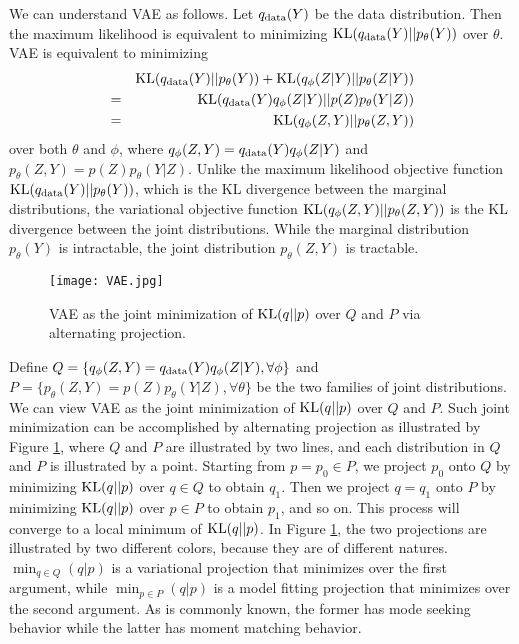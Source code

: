 \documentclass{article}
\def\KL{{\rm KL}}
\begin{document}
We can understand VAE as follows. Let $q_{\rm data}(Y)$ be the data distribution. Then the maximum likelihood is equivalent to minimizing ${\rm KL}(q_{\rm data}(Y)||p_\theta(Y))$ over $\theta$. VAE is equivalent to minimizing 
\begin{eqnarray}
\label{eqn5}
&&{\rm KL}(q_{\rm data}(Y)||p_\theta(Y)) + {\rm KL}(q_\phi(Z|Y)||p_\theta(Z|Y)) \nonumber \\
&=& {\rm KL}(q_{\rm data}(Y) q_\phi(Z|Y)||p(Z) p_\theta(Y|Z)) \\
&=&  {\rm KL}(q_\phi(Z, Y)||p_\theta(Z, Y)) 
\end{eqnarray}
over both $\theta$ and $\phi$, where $q_\phi(Z, Y) = q_{\rm data}(Y) q_\phi(Z|Y)$ and $p_\theta(Z, Y) =  p(Z) p_\theta(Y|Z)$.  Unlike the maximum likelihood objective function ${\rm KL}(q_{\rm data}(Y)||p_\theta(Y))$, which is the KL divergence between the marginal distributions, the variational objective function   ${\rm KL}(q_\phi(Z, Y)||p_\theta(Z, Y))$  is the KL divergence between the joint distributions. While the marginal distribution $p_\theta(Y)$ is intractable, the joint distribution $p_\theta(Z, Y)$ is tractable. 
\begin{figure}[h]
\begin{center}
\texttt{[image: VAE.jpg]}
\caption{VAE as the joint minimization of $\KL(q||p)$ over $Q$ and $P$ via alternating projection. }
\label{fig:VAE}
\end{center}
\end{figure}

Define $Q = \{ q_\phi(Z, Y) = q_{\rm data}(Y) q_\phi(Z|Y), \forall \phi\}$ and $P = \{ p_\theta(Z, Y) =  p(Z) p_\theta(Y|Z), \forall \theta\}$ be the two families of joint distributions. We can view VAE as the joint minimization of ${\rm KL}(q||p)$ over $Q$ and $P$. Such joint minimization can be accomplished by alternating projection as illustrated by Figure \ref{fig:VAE}, where $Q$ and $P$ are illustrated by two lines, and each distribution in $Q$ and $P$ is illustrated by a point. Starting from $p = p_0 \in P$, we project $p_0$ onto $Q$ by minimizing ${\rm KL}(q||p)$ over $q \in Q$ to obtain $q_1$. Then we project $q = q_1$ onto $P$ by minimizing ${\rm KL}(q||p)$ over $p \in P$ to obtain $p_1$, and so on. This process will converge to a local minimum of ${\rm KL}(q||p)$. 
In Figure \ref{fig:VAE}, the two projections are illustrated by two different colors, because they are of different natures. $\min_{q\in Q}(q|p)$ is a variational projection that minimizes over the first argument, while  $\min_{p \in P}(q|p)$ is a model fitting projection that minimizes over the second argument. As is commonly known, the former has mode seeking behavior while the latter has moment matching behavior.  
\end{document}
